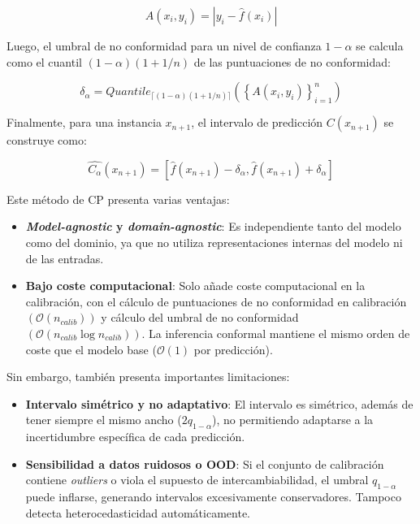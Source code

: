 $$
A(x_i, y_i) = | y_i - \hat{f}(x_i) |
$$

Luego, el umbral de no conformidad para un nivel de confianza $1-\alpha$ se calcula como el cuantil $(1-\alpha)(1+1/n)$ de las puntuaciones de no conformidad:

$$
\delta_\alpha = Quantile_{ \lceil  (1-\alpha) (1 + 1/n)  \rceil } ( \left\{ A(x_i,y_i) \right\}_{i=1}^n )
$$

Finalmente, para una instancia $x_{n+1}$, el intervalo de predicción $C(x_{n+1})$ se construye como: 

$$
\hat{C_\alpha}(x_{n+1}) = \left[ \hat{f}(x_{n+1}) - \delta_\alpha, \hat{f}(x_{n+1}) + \delta_\alpha\right]
$$

Este método de CP presenta varias ventajas: 

\begin{itemize}

    \item \textbf{\textit{Model-agnostic} y \textit{domain-agnostic}}: Es independiente tanto del modelo como del dominio, ya que no utiliza representaciones internas del modelo ni de las entradas. 
    
    \item \textbf{Bajo coste computacional}: Solo añade coste computacional en la calibración, con el cálculo de puntuaciones de no conformidad en calibración $\left( \mathcal{O}(n_{calib}) \right)$ y cálculo del umbral de no conformidad $\left( \mathcal{O}(n_{calib} \log n_{calib}) \right)$. La inferencia conformal mantiene el mismo orden de coste que el modelo base ($\mathcal{O}(1)$ por predicción). 

\end{itemize}

Sin embargo, también presenta importantes limitaciones: 

\begin{itemize}
    
    \item \textbf{Intervalo simétrico y no adaptativo}: El intervalo es simétrico, además de tener siempre el mismo ancho ($2q_{1-\alpha}$), no permitiendo adaptarse a la incertidumbre específica de cada predicción. 

    \item \textbf{Sensibilidad a datos ruidosos o OOD}: Si el conjunto de calibración contiene \textit{outliers} o viola el supuesto de intercambiabilidad, el umbral \(q_{1-\alpha}\) puede inflarse, generando intervalos excesivamente conservadores. Tampoco detecta heterocedasticidad automáticamente.

\end{itemize}

